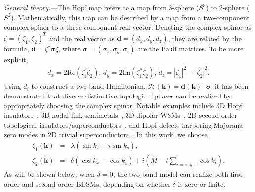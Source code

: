 \documentclass[aps,prl,twocolumn,longbibliography]{revtex4-1}
\newcommand{\bk}{\boldsymbol k}
\newcommand{\bd}{\boldsymbol d}
\begin{document}
{\it General theory.---}The Hopf map refers to a map from $3$-sphere
($S^{3}$) to 2-sphere ($S^{2}$). Mathematically, this map can be described
by a map from a two-component complex spinor to a three-component real vector.
Denoting the complex spinor as $\zeta=(\zeta_{1},\zeta_{2})^{T}$ and the real vector
as $\bd=(d_{x},d_{y},d_{z})$, they are related by the formula,
$\bd=\zeta^{\dag}\boldsymbol{\sigma}\zeta$, where $\boldsymbol{\sigma}=(\sigma_{x},\sigma_{y},\sigma_{z})$
are the Pauli matrices. To be more explicit,
\begin{eqnarray}
d_{x}=2\text{Re}(\zeta_{1}^{*}\zeta_{2}),\,
d_{y}=2\text{Im}(\zeta_{1}^{*}\zeta_{2}),\,
d_{z}=|\zeta_{1}|^{2}-|\zeta_{2}|^{2}.
\end{eqnarray}
Using $d_{i}$ to construct a two-band Hamiltonian, $\mathcal{H}(\bk)=\bd(\bk)\cdot\boldsymbol{\sigma}$,
it has been demonstrated that diverse distinctive topological phases can be realized by appropriately choosing
the complex spinor. Notable examples include 3D Hopf insulators~\cite{Moore2008hopf,
deng2013hopf,Aris2021hopf,Zhu2021hopf,Zhu2023spinhopf,Lim2023hopf,Wang2023hopf}, 3D nodal-link
semimetals~\cite{Yan2017link,Chen2017link,Ezawa2017hopf}, 3D dipolar WSMs~\cite{Tyner2024dipolar}, 2D second-order
topological insulators/superconductors~\cite{Yan2019hosca,Niu2021hopf,Wu2023higher}, and Hopf defects harboring
Majorana zero modes in 2D trivial superconductors~\cite{Yan2017hopf}. In this work, we choose
\begin{eqnarray}
\zeta_{1}(\bk)&=&\lambda(\sin k_{x}+i\sin k_{y}),\nonumber\\
\zeta_{2}(\bk)&=&\delta(\cos k_{x}-\cos k_{y})+i(M-t\sum_{i=x,y,z}\cos k_{i}).
\end{eqnarray}
As will be shown below, when $\delta=0$, the two-band model can realize
both first-order and second-order BDSMs, depending on whether $\delta$ is zero or finite.
\end{document}
